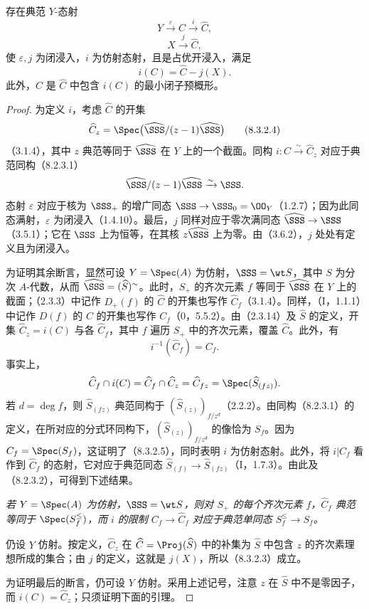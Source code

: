 存在典范 $Y$-态射
\begin{equation}
Y\xrightarrow{\varepsilon}C\xrightarrow{i}\widehat C,
\tag{8.3.2.1}
\end{equation}
\begin{equation}
X\xrightarrow{j}\widehat C,
\tag{8.3.2.2}
\end{equation}
使 $\varepsilon,j$ 为闭浸入，$i$ 为仿射态射，且是占优开浸入，满足
\begin{equation}
i(C)=\widehat C-j(X).
\tag{8.3.2.3}
\end{equation}
此外，$\widehat C$ 是 $\widehat C$ 中包含 $i(C)$ 的最小闭子预概形。
\begin{proof}
为定义 $i$，考虑 $\widehat C$ 的开集
\begin{equation}
\widehat C_z=\Spec\bigl(\widehat{\SSS}/(z-1)\widehat{\SSS}\bigr)
\tag{8.3.2.4}
\end{equation}
（3.1.4），其中 $z$ 典范等同于 $\widehat{\SSS}$ 在 $Y$ 上的一个截面。同构 $i:C\xrightarrow{\sim}\widehat C_z$ 对应于典范同构（8.2.3.1）
\[
\widehat{\SSS}/(z-1)\widehat{\SSS}\xrightarrow{\sim}\SSS.
\]
态射 $\varepsilon$ 对应于核为 $\SSS_+$ 的增广同态 $\SSS\to\SSS_0=\OO_Y$（1.2.7）；因为此同态满射，$\varepsilon$ 为闭浸入（1.4.10）。最后，$j$ 同样对应于零次满同态 $\widehat{\SSS}\to\SSS$（3.5.1）；它在 $\SSS$ 上为恒等，在其核 $z\widehat{\SSS}$ 上为零。由（3.6.2），$j$ 处处有定义且为闭浸入。

为证明其余断言，显然可设 $Y=\Spec(A)$ 为仿射，$\SSS=\wt S$，其中 $S$ 为分次 $A$-代数，从而 $\widehat{\SSS}=(\widehat S)^{\sim}$。此时，$S_+$ 的齐次元素 $f$ 等同于 $\widehat{\SSS}$ 在 $Y$ 上的截面；（2.3.3）中记作 $D_+(f)$ 的 $\widehat C$ 的开集也写作 $\widehat C_f$（3.1.4）。同样，（I，1.1.1）中记作 $D(f)$ 的 $C$ 的开集也写作 $C_f$（0，5.5.2）。由（2.3.14）及 $\widehat S$ 的定义，开集 $\widehat C_z=i(C)$ 与各 $\widehat C_f$，其中 $f$ 遍历 $S_+$ 中的齐次元素，覆盖 $\widehat C$。此外，有
\begin{equation}
i^{-1}(\widehat C_f)=C_f.
\tag{8.3.2.5}
\end{equation}
事实上，
\[
\widehat C_f\cap i(C)=\widehat C_f\cap\widehat C_z
=\widehat C_{fz}=\Spec(\widehat S_{(fz)}).
\]
若 $d=\deg f$，则 $\widehat S_{(fz)}$ 典范同构于 $(\widehat S_{(z)})_{f/z^d}$（2.2.2）。由同构（8.2.3.1）的定义，在所对应的分式环同构下，$(\widehat S_{(z)})_{f/z^d}$ 的像恰为 $S_f$。因为 $C_f=\Spec(S_f)$，这证明了（8.3.2.5），同时表明 $i$ 为仿射态射。此外，将 $i|C_f$ 看作到 $\widehat C_f$ 的态射，它对应于典范同态 $\widehat S_{(f)}\to\widehat S_{(fz)}$（I，1.7.3）。由此及（8.2.3.2），可得到下述结果。

\emph{若 $Y=\Spec(A)$ 为仿射，$\SSS=\wt S$，则对 $S_+$ 的每个齐次元素 $f$，$\widehat C_f$ 典范等同于 $\Spec(S_f^{\leq})$，而 $i$ 的限制 $C_f\to\widehat C_f$ 对应于典范单同态 $S_f^{\leq}\to S_f$。}

仍设 $Y$ 仿射。按定义，$\widehat C_z$ 在 $\widehat C=\Proj(\widehat S)$ 中的补集为 $\widehat S$ 中包含 $z$ 的齐次素理想所成的集合；由 $j$ 的定义，这就是 $j(X)$，所以（8.3.2.3）成立。

为证明最后的断言，仍可设 $Y$ 仿射。采用上述记号，注意 $z$ 在 $\widehat S$ 中不是零因子，而 $i(C)=\widehat C_z$；只须证明下面的引理。
\end{proof}

